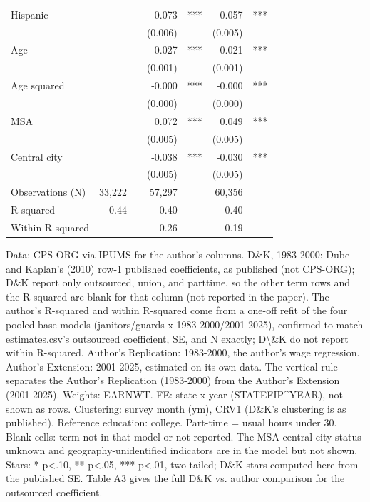 \begin{table}[!t]
\begin{tabular}{l|rlrl|rl}
Hispanic &  &  & -0.073 & *** & -0.057 & *** \\
 &  &  & (0.006) &  & (0.005) &  \\
Age &  &  & 0.027 & *** & 0.021 & *** \\
 &  &  & (0.001) &  & (0.001) &  \\
Age squared &  &  & -0.000 & *** & -0.000 & *** \\
 &  &  & (0.000) &  & (0.000) &  \\
MSA &  &  & 0.072 & *** & 0.049 & *** \\
 &  &  & (0.005) &  & (0.005) &  \\
Central city &  &  & -0.038 & *** & -0.030 & *** \\
 &  &  & (0.005) &  & (0.005) &  \\
Observations (N) & 33,222 &  & 57,297 &  & 60,356 &  \\
R-squared & 0.44 &  & 0.40 &  & 0.40 &  \\
Within R-squared &  &  & 0.26 &  & 0.19 &  \\
\bottomrule
\end{tabular}\par\raggedright
\begin{minipage}{\linewidth}
Data: CPS-ORG via IPUMS for the author's columns. D\&K, 1983-2000: Dube and Kaplan's (2010) row-1 published coefficients, as published (not CPS-ORG); D\&K report only outsourced, union, and parttime, so the other term rows and the R-squared are blank for that column (not reported in the paper). The author's R-squared and within R-squared come from a one-off refit of the four pooled base models (janitors/guards x 1983-2000/2001-2025), confirmed to match estimates.csv's outsourced coefficient, SE, and N exactly; D\textbackslash{}\&K do not report within R-squared. Author's Replication: 1983-2000, the author's wage regression. Author's Extension: 2001-2025, estimated on its own data. The vertical rule separates the Author's Replication (1983-2000) from the Author's Extension (2001-2025). Weights: EARNWT. FE: state x year (STATEFIP\textasciicircum{}YEAR), not shown as rows. Clustering: survey month (ym), CRV1 (D\&K's clustering is as published). Reference education: college. Part-time = usual hours under 30. Blank cells: term not in that model or not reported. The MSA central-city-status-unknown and geography-unidentified indicators are in the model but not shown. Stars: * p<.10, ** p<.05, *** p<.01, two-tailed; D\&K stars computed here from the published SE. Table A3 gives the full D\&K vs. author comparison for the outsourced coefficient.\\
\end{minipage}
\end{table}
